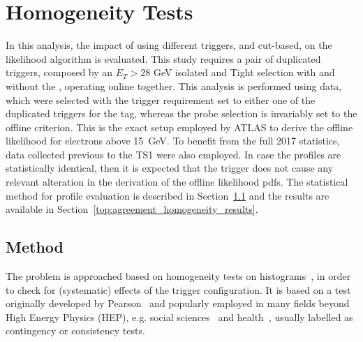 \FloatBarrier
\section[Homogeneity Tests]{Homogeneity Tests}\label{ssec:agreement}

In this 
analysis, the impact of using different triggers, \rnn{} and cut-based, on the likelihood algorithm is evaluated. This 
study requires a pair of duplicated triggers, composed by an $E_T > 28$ GeV isolated and Tight selection with and without the \rnn{}, operating online together. 
This analysis is performed using \Zee{} \tnp{} data, which were selected with the trigger requirement set to either one of the duplicated triggers for the tag, whereas the probe selection is invariably set to the offline \vloose{} criterion. This is the exact setup employed by ATLAS to derive the offline likelihood for electrons above \SI{15}{\GeV}. To benefit from the full 2017 statistics, data collected previous to the TS1 were also employed. In case the profiles are statistically identical, then it is expected that the \rnn{} trigger does not cause any relevant alteration in the derivation of the offline likelihood pdfs.  The statistical method for profile evaluation is described in Section~\ref{top:homogeneity_method} and the results are available in Section~\ref{top:agreement_homogeneity_results}.




\subsection{Method}\label{top:homogeneity_method}



The problem is approached based on homogeneity tests on histograms~\cite{homogeneity_test}, in order to check for (systematic) effects of the trigger configuration. It is based on a test originally developed by Pearson~\cite{pearson1911probability} and popularly employed in many fields beyond High Energy Physics (HEP), e.g. social sciences~\cite{wickens2014multiway} and health~\cite{ma2015homogeneity}, usually labelled as contingency or consistency tests.

